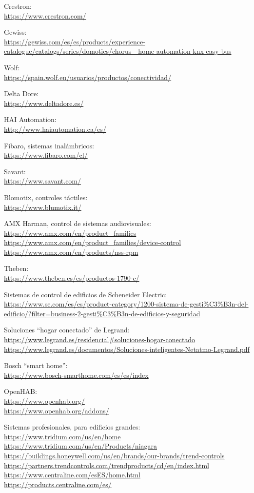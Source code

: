\documentclass[spanish,10pt,a4paper,final,oneside]{article}
\begin{document}
Crestron:
\\ \url{https://www.crestron.com/}

Gewiss:
\\ \url{https://gewiss.com/es/es/products/experience-catalogue/catalogs/series/domotics/chorus---home-automation-knx-easy-bus}

Wolf:
\\ \url{https://spain.wolf.eu/usuarios/productos/conectividad/}

Delta Dore:
\\ \url{https://www.deltadore.es/}

HAI Automation:
\\ \url{http://www.haiautomation.ca/es/}

Fibaro, sistemas inalámbricos:
\\ \url{https://www.fibaro.com/cl/}

Savant:
\\ \url{https://www.savant.com/}

Blomotix, controles táctiles:
\\ \url{https://www.blumotix.it/}

AMX Harman, control de sistemas audiovisuales:
\\ \url{https://www.amx.com/en/product_families}
\\ \url{https://www.amx.com/en/product_families/device-control}
\\ \url{https://www.amx.com/en/products/nss-rpm}

Theben:
\\ \url{https://www.theben.es/es/productos-1790-c/}

Sistemas de control de edificios de Scheneider Electric:
\\ \url{ https://www.se.com/es/es/product-category/1200-sistema-de-gesti%C3%B3n-del-edificio/?filter=business-2-gesti%C3%B3n-de-edificios-y-seguridad}

Soluciones ``hogar conectado'' de Legrand:
\\ \url{https://www.legrand.es/residencial#soluciones-hogar-conectado}
\\ \url{https://www.legrand.es/documentos/Soluciones-inteligentes-Netatmo-Legrand.pdf}

Bosch ``smart home'':
\\ \url{https://www.bosch-smarthome.com/es/es/index}

OpenHAB:
\\ \url{https://www.openhab.org/}
\\ \url{https://www.openhab.org/addons/}


Sistemas profesionales, para edificios grandes:
\\ \url{https://www.tridium.com/us/en/home}
\\ \url{https://www.tridium.com/us/en/Products/niagara}
\\ \url{https://buildings.honeywell.com/us/en/brands/our-brands/trend-controls}
\\ \url{https://partners.trendcontrols.com/trendproducts/cd/en/index.html}
\\ \url{https://www.centraline.com/esES/home.html}
\\ \url{https://products.centraline.com/es/}
\end{document}

